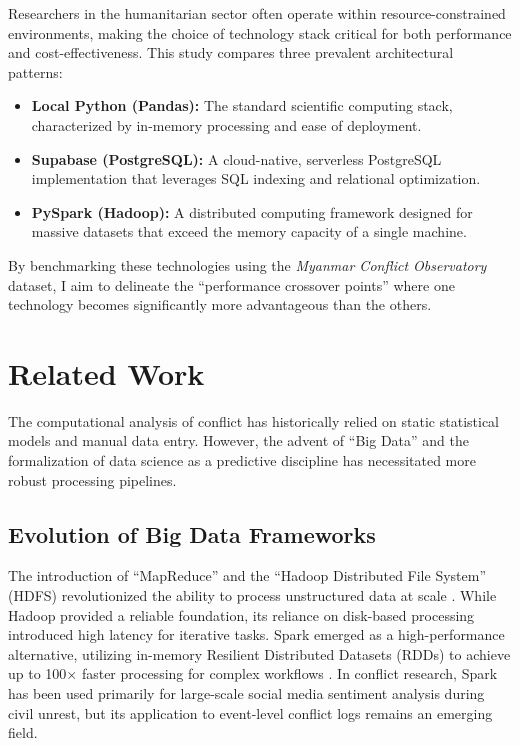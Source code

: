 \documentclass[conference]{IEEEtran}
\begin{document}
Researchers in the humanitarian sector often operate within resource-constrained environments, making the choice of technology stack critical for both performance and cost-effectiveness. This study compares three prevalent architectural patterns:
\begin{itemize}
    \item \textbf{Local Python (Pandas):} The standard scientific computing stack, characterized by in-memory processing and ease of deployment.
    \item \textbf{Supabase (PostgreSQL):} A cloud-native, serverless PostgreSQL implementation that leverages SQL indexing and relational optimization.
    \item \textbf{PySpark (Hadoop):} A distributed computing framework designed for massive datasets that exceed the memory capacity of a single machine.
\end{itemize}

By benchmarking these technologies using the \textit{Myanmar Conflict Observatory} dataset, I aim to delineate the ``performance crossover points'' where one technology becomes significantly more advantageous than the others.

\section{Related Work}

The computational analysis of conflict has historically relied on static statistical models and manual data entry. However, the advent of ``Big Data'' and the formalization of data science as a predictive discipline \cite{dhar2013data} has necessitated more robust processing pipelines. 

\subsection{Evolution of Big Data Frameworks}
The introduction of ``MapReduce'' and the ``Hadoop Distributed File System'' (HDFS) revolutionized the ability to process unstructured data at scale \cite{white2012hadoop,dean2008mapreduce,ghemawat2003google}. While Hadoop provided a reliable foundation, its reliance on disk-based processing introduced high latency for iterative tasks. Spark emerged as a high-performance alternative, utilizing in-memory Resilient Distributed Datasets (RDDs) to achieve up to 100$\times$ faster processing for complex workflows \cite{zaharia2010spark}. In conflict research, Spark has been used primarily for large-scale social media sentiment analysis during civil unrest, but its application to event-level conflict logs remains an emerging field.
\end{document}
